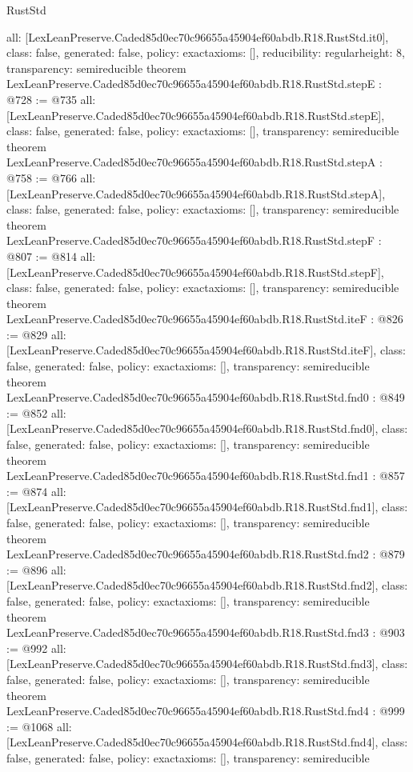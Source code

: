 \begin{lexlean}{RustStd}
\begin{coremodule}
{  all: [LexLeanPreserve.Caded85d0ec70c96655a45904ef60abdb.R18.RustStd.it0],
  class: false,
  generated: false,
  policy: exact{axioms: []},
  reducibility: regular{height: 8},
  transparency: semireducible
}
theorem LexLeanPreserve.Caded85d0ec70c96655a45904ef60abdb.R18.RustStd.stepE : @728 := @735 {
  all: [LexLeanPreserve.Caded85d0ec70c96655a45904ef60abdb.R18.RustStd.stepE],
  class: false,
  generated: false,
  policy: exact{axioms: []},
  transparency: semireducible
}
theorem LexLeanPreserve.Caded85d0ec70c96655a45904ef60abdb.R18.RustStd.stepA : @758 := @766 {
  all: [LexLeanPreserve.Caded85d0ec70c96655a45904ef60abdb.R18.RustStd.stepA],
  class: false,
  generated: false,
  policy: exact{axioms: []},
  transparency: semireducible
}
theorem LexLeanPreserve.Caded85d0ec70c96655a45904ef60abdb.R18.RustStd.stepF : @807 := @814 {
  all: [LexLeanPreserve.Caded85d0ec70c96655a45904ef60abdb.R18.RustStd.stepF],
  class: false,
  generated: false,
  policy: exact{axioms: []},
  transparency: semireducible
}
theorem LexLeanPreserve.Caded85d0ec70c96655a45904ef60abdb.R18.RustStd.iteF : @826 := @829 {
  all: [LexLeanPreserve.Caded85d0ec70c96655a45904ef60abdb.R18.RustStd.iteF],
  class: false,
  generated: false,
  policy: exact{axioms: []},
  transparency: semireducible
}
theorem LexLeanPreserve.Caded85d0ec70c96655a45904ef60abdb.R18.RustStd.fnd0 : @849 := @852 {
  all: [LexLeanPreserve.Caded85d0ec70c96655a45904ef60abdb.R18.RustStd.fnd0],
  class: false,
  generated: false,
  policy: exact{axioms: []},
  transparency: semireducible
}
theorem LexLeanPreserve.Caded85d0ec70c96655a45904ef60abdb.R18.RustStd.fnd1 : @857 := @874 {
  all: [LexLeanPreserve.Caded85d0ec70c96655a45904ef60abdb.R18.RustStd.fnd1],
  class: false,
  generated: false,
  policy: exact{axioms: []},
  transparency: semireducible
}
theorem LexLeanPreserve.Caded85d0ec70c96655a45904ef60abdb.R18.RustStd.fnd2 : @879 := @896 {
  all: [LexLeanPreserve.Caded85d0ec70c96655a45904ef60abdb.R18.RustStd.fnd2],
  class: false,
  generated: false,
  policy: exact{axioms: []},
  transparency: semireducible
}
theorem LexLeanPreserve.Caded85d0ec70c96655a45904ef60abdb.R18.RustStd.fnd3 : @903 := @992 {
  all: [LexLeanPreserve.Caded85d0ec70c96655a45904ef60abdb.R18.RustStd.fnd3],
  class: false,
  generated: false,
  policy: exact{axioms: []},
  transparency: semireducible
}
theorem LexLeanPreserve.Caded85d0ec70c96655a45904ef60abdb.R18.RustStd.fnd4 : @999 := @1068 {
  all: [LexLeanPreserve.Caded85d0ec70c96655a45904ef60abdb.R18.RustStd.fnd4],
  class: false,
  generated: false,
  policy: exact{axioms: []},
  transparency: semireducible
}
\end{coremodule}
\end{lexlean}
